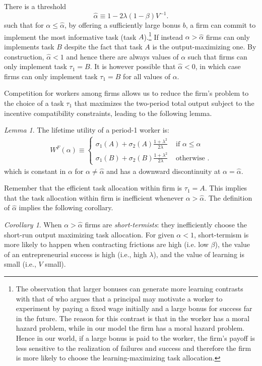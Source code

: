 \documentclass[12pt,american]{paper}
\theoremstyle{remark}
\newtheorem{lemma}{Lemma}
\newtheorem{cor}{Corollary}
\begin{document}
There is a threshold
\[
 \hat \alpha \equiv 1- 2 \lambda (1-\beta) V^{-1}.
\]
such that for $\alpha \leq \hat \alpha$, by offering a sufficiently large bonus $b$,  a firm can commit to  implement the most informative task (task $A$).\footnote{ The observation that larger bonuses can generate more learning contrasts with that of \citet{manso2011motivating} who argues that a principal may motivate a worker to experiment by paying a fixed wage initially and a large bonus for success far in the future. The reason for this contrast is that in \cite{manso2011motivating} the worker has a moral hazard problem, while in our model the firm has a moral hazard problem. Hence in our world, if a large bonus is paid to the worker, the firm's payoff is less sensitive to the realization of failures and success and therefore the firm is more likely to choose the learning-maximizing task allocation.} If instead  $\alpha > \hat \alpha$  firms can only implements task $B$ despite the fact that task $A$ is the output-maximizing one. By construction, $\hat \alpha <1$ and hence there are always values of $\alpha$ such that firms can only implement task $\tau_1=B$. It is however possible that $\hat \alpha <0$, in which case firms can only implement task $\tau_1=B$ for all values of $\alpha$.



Competition  for workers among firms allows us to reduce the firm's problem to the choice of a task $\tau_1$ that maximizes the two-period total output subject to the incentive compatibility constraints, leading to the following lemma.
\begin{lemma}
The lifetime utility of a period-1 worker is:
\begin{align}\label{eq: value worker}
W^F(\alpha) \equiv
\begin{cases}
\sigma_1(A)+\sigma_2(A)\frac{1+\lambda^2}{2\lambda} &\text{ if } \alpha \leq \hat \alpha\\
\sigma_1(B)+\sigma_2(B)\frac{1+\lambda^2}{2\lambda} &\text{ otherwise }.
\end{cases}
\end{align}
which is constant in $\alpha$ for $\alpha \neq \hat \alpha$ and has a downward discontinuity at $\alpha=\hat \alpha$.
\end{lemma}

Remember that the efficient task allocation within firm is $\tau_1=A$. This implies that the task allocation within firm is inefficient whenever  $\alpha>\hat \alpha$. The definition of $\hat \alpha$ implies the following corollary.
\begin{cor}
When $\alpha > \hat \alpha$ firms are \textit{short-termists}: they inefficiently choose the short-run output maximizing task allocation. For given $\alpha<1$, short-termism is more likely  to happen when  contracting frictions are high (i.e. low $\beta$),  the value of an entrepreneurial success is high (i.e., high $\lambda$), and the value of learning   is small (i.e., $V$ small). 
\end{cor}
\end{document}
